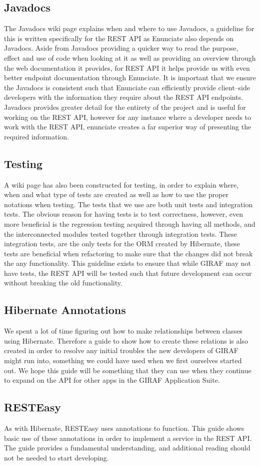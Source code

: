 \subsection{Javadocs}
The Javadocs wiki page explains when and where to use Javadocs, a guideline for this is written specifically for the REST API as Enunciate also depends on Javadocs.
Aside from Javadocs providing a quicker way to read the purpose, effect and use of code when looking at it as well as providing an overview through the web documentation it provides, for REST API it helps provide us with even better endpoint documentation through Enunciate.
It is important that we ensure the Javadocs is consistent such that Enunciate can efficiently provide client--side developers with the information they require about the REST API endpoints.
Javadocs provides greater detail for the entirety of the project and is useful for working on the REST API, however for any instance where a developer needs to work with the REST API, enunciate creates a far superior way of presenting the required information.

\subsection{Testing}
A wiki page has also been constructed for testing, in order to explain where, when and what type of tests are created as well as how to use the proper notations when testing.
The tests that we use are both unit tests and integration tests.
The obvious reason for having tests is to test correctness, however, even more beneficial is the regression testing acquired through having all methods, and the interconnected modules tested together through integration tests.
These integration tests, are the only tests for the ORM created by Hibernate, these tests are beneficial when refactoring to make sure that the changes did not break the any functionality.
This guideline exists to ensure that while GIRAF may not have tests, the REST API will be tested such that future development can occur without breaking the old functionality.

\subsection{Hibernate Annotations}
We spent a lot of time figuring out how to make relationships between classes using Hibernate.
Therefore a guide to show how to create these relations is also created in order to resolve any initial troubles the new developers of GIRAF might run into, something we could have used when we first ourselves started out.
We hope this guide will be something that they can use when they continue to expand on the API for other apps in the GIRAF Application Suite.

\subsection{RESTEasy}
As with Hibernate, RESTEasy uses annotations to function.
This guide shows basic use of these annotations in order to implement a service in the REST API.
The guide provides a fundamental understanding, and additional reading should not be needed to start developing.

